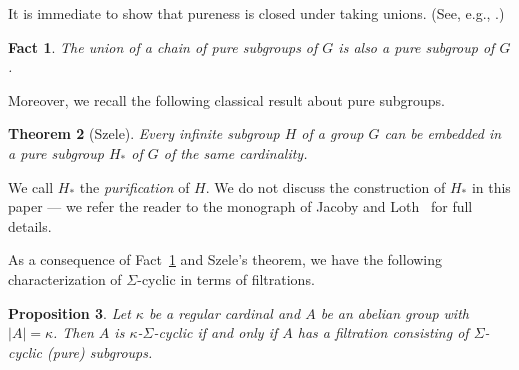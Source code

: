 \documentclass[a4paper]{amsart}
\newtheorem{theorem}{Theorem}[section]
\newtheorem{proposition}[theorem]{Proposition}
\newtheorem{fact}[theorem]{Fact}
\theoremstyle{definition}
\theoremstyle{remark}
\numberwithin{equation}{section}
\begin{document}
It is immediate to show that pureness is closed under taking unions. (See, e.g., \cite[p.~51]{Fuc15}.)

\begin{fact}
    \label{fac : pure union}
    The union of a chain of pure subgroups of \(G\) is also a pure subgroup of \(G\).
\end{fact}

Moreover, we recall the following classical result about pure subgroups.

\begin{theorem}[Szele]
    \label{thm:szele-pure}
    Every infinite subgroup \(H\) of a group $G$ can be embedded in a pure subgroup \(H_*\) of $G$ of the same cardinality.
\end{theorem}

We call \(H_*\) the \emph{purification} of \(H\). We do not discuss the construction of \(H_*\) in this paper --- we refer the reader to the monograph of Jacoby and Loth~\cite{JacLot} for full details.

 As a consequence of Fact~\ref{fac : pure union} and Szele's theorem, we have the following characterization of \(\Sigma\)-cyclic in terms of filtrations.


\begin{proposition}\label{prop:cyclic-filtration}
    Let \(\kappa\) be a regular cardinal and \(A\) be an abelian group with \(|A| = \kappa\).
     Then \(A\) is \(\kappa\)-\(\Sigma\)-cyclic if and only if \(A\) has a filtration consisting of \(\Sigma\)-cyclic  (pure)
     subgroups.
\end{proposition}
\end{document}
